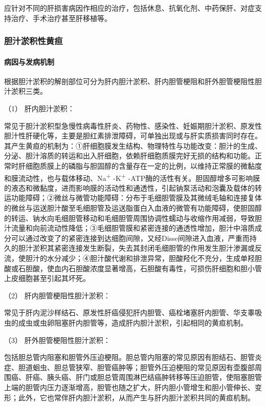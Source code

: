应针对不同的肝损害病因作相应的治疗，包括休息、抗氧化剂、中药保肝、对症支持治疗、手术治疗甚至肝移植等。

\subsubsection{胆汁淤积性黄疸}

\paragraph{病因与发病机制}

根据胆汁淤积的解剖部位可分为肝内胆汁淤积、肝内胆管梗阻和肝外胆管梗阻性胆汁淤积三类。

\hypertarget{text00039.htmlux5cux23CHP1-16-4-4-1-1}{}
（1） 肝内胆汁淤积：

常见于胆汁淤积型急慢性病毒性肝炎、药物性、感染性、妊娠期胆汁淤积、原发性胆汁性肝硬化等，主要是胆红素排泄障碍，可单独出现或与肝实质损害同时存在。其产生黄疸的机制为：①肝细胞膜发生结构、物理特性与功能改变：胆汁的生成、分泌、胆汁溶质的转运和出入肝细胞，依赖肝细胞质膜完好无损的结构和功能。正常时肝细胞质膜上的磷脂与胆固醇的含量存在一定的比例，以维持正常膜的微黏度和膜流动性，也与载体移动、Na\textsuperscript{+}
-K\textsuperscript{+}
-ATP酶的活性有关。胆固醇增多可影响膜的液态和微黏度，进而影响膜的活动性和通透性，引起钠泵活动和泡囊及载体的转运功能障碍；②微丝与微管功能障碍：分布于毛细胆管膜及其微绒毛轴和连接复体的微丝与运送胆汁酸至毛细胆管及运送脂蛋白入血液的微管有功能障碍，使胆固醇的转运、钠水向毛细胆管移动和毛细胆管周围协调性蠕动与收缩作用减弱，导致胆汁流量和向前流动性降低；③毛细胆管膜和紧密连接的通透性增加，胆汁中溶质成分可以通过改变了的紧密连接到达细胞间隙，又经Disse间隙进入血液，严重而持久的胆汁淤积其紧密连接发生断裂，失去其封闭毛细胆管的作用发生胆汁渗漏或反流，使胆汁的水分减少；④胆汁酸代谢和排泄异常，胆酸羟化不充分，生成单羟胆酸或石胆酸，使血内石胆酸浓度显著增高，石胆酸有毒性，可损伤肝细胞和胆小管上皮细胞甚至引起其坏死。

\hypertarget{text00039.htmlux5cux23CHP1-16-4-4-1-2}{}
（2） 肝内胆管梗阻性胆汁淤积：

常见于肝内泥沙样结石、原发性肝癌侵犯肝内胆管、癌栓堵塞肝内胆管、华支睾吸虫的成虫或虫卵阻塞肝内胆管等，造成肝内胆汁淤积，引起相同的黄疸机制。

\hypertarget{text00039.htmlux5cux23CHP1-16-4-4-1-3}{}
（3） 肝外胆管梗阻性胆汁淤积：

包括胆总管内阻塞和胆管外压迫梗阻。胆总管内阻塞的常见原因有胆结石、胆管炎症、胆道蛔虫、胆总管狭窄、胆管癌肿等；胆管外压迫梗阻的常见原因有壶腹部周围癌、肝癌、胰头癌、肝门或胆总管周围淋巴结癌肿转移等压迫胆管，使阻塞胆管上端的胆管内压力逐渐增高，胆管也随之扩大，肝内胆小管增生和胆小管伸长、变形；此外，它也常伴肝内胆汁淤积，从而产生与肝内胆汁淤积共同的黄疸机制。

